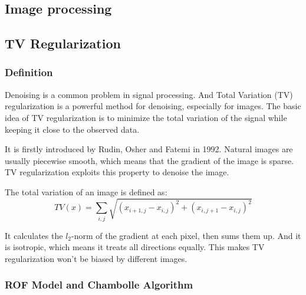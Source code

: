 \documentclass[12pt]{ctexart}
\begin{document}
\newpage
\thispagestyle{empty}
\begin{center}
    \vspace*{96pt}
    \fontsize{60}{60}\par
    \fontsize{26}{31.2}\section{\textbf{Image processing}}\par %
    \vspace{25pt}
    \fontsize{18}{21.6}\par %
    \vfill
\end{center}

\newpage
\subsection{\textbf{TV Regularization}}
\subsubsection{\textbf{Definition}}

Denoising is a common problem in signal processing. And Total Variation (TV)
regularization is a powerful method for denoising, especially for images. The basic
idea of TV regularization is to minimize the total variation of the signal while
keeping it close to the observed data.

It is firstly introduced by Rudin, Osher and Fatemi in 1992. Natural images are
usually piecewise smooth, which means that the gradient of the image is sparse. TV
regularization exploits this property to denoise the image.

The total variation of an image is defined as:
\[
  TV(x) = \sum_{i,j} \sqrt{(x_{i+1,j} - x_{i,j})^2 + (x_{i,j+1} - x_{i,j})^2}
\]

It calculates the $l_2$-norm of the gradient at each pixel, then sums them up. And
it is isotropic, which means it treats all directions equally. This makes TV
regularization won't be biased by different images.

\subsubsection{\textbf{ROF Model and Chambolle Algorithm}}
\end{document}
